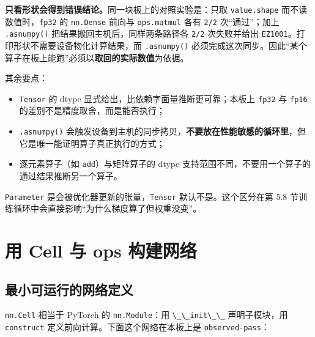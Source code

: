 \textbf{只看形状会得到错误结论。}同一块板上的对照实验是：只取
\passthrough{\lstinline!value.shape!}
而不读数值时，\passthrough{\lstinline!fp32!} 的
\passthrough{\lstinline!nn.Dense!} 前向与
\passthrough{\lstinline!ops.matmul!} 各有 \passthrough{\lstinline!2/2!}
次``通过''；加上 \passthrough{\lstinline!.asnumpy()!}
把结果搬回主机后，同样两条路径各 \passthrough{\lstinline!2/2!}
次失败并给出
\passthrough{\lstinline!EZ1001!}。打印形状不需要设备物化计算结果，而
\passthrough{\lstinline!.asnumpy()!}
必须完成这次同步。因此``某个算子在板上能跑''必须以\textbf{取回的实际数值}为依据。

其余要点：

\begin{itemize}
\tightlist
\item
  \passthrough{\lstinline!Tensor!} 的 dtype
  显式给出，比依赖字面量推断更可靠；本板上
  \passthrough{\lstinline!fp32!} 与 \passthrough{\lstinline!fp16!}
  的差别不是精度取舍，而是能否执行；
\item
  \passthrough{\lstinline!.asnumpy()!}
  会触发设备到主机的同步拷贝，\textbf{不要放在性能敏感的循环里}，但它是唯一能证明算子真正执行的方式；
\item
  逐元素算子（如 \passthrough{\lstinline!add!}）与矩阵算子的 dtype
  支持范围不同，不要用一个算子的通过结果推断另一个算子。
\end{itemize}

\passthrough{\lstinline!Parameter!}
是会被优化器更新的张量，\passthrough{\lstinline!Tensor!}
默认不是。这个区分在第 5.8
节训练循环中会直接影响``为什么梯度算了但权重没变''。

\section{用 Cell 与 ops 构建网络}\label{src-book-chapter5-h10}

\subsection{最小可运行的网络定义}\label{src-book-chapter5-h11}

\passthrough{\lstinline!nn.Cell!} 相当于 PyTorch 的
\passthrough{\lstinline!nn.Module!}：用
\passthrough{\lstinline!\_\_init\_\_!} 声明子模块，用
\passthrough{\lstinline!construct!} 定义前向计算。下面这个网络在本板上是
\passthrough{\lstinline!observed-pass!}：

